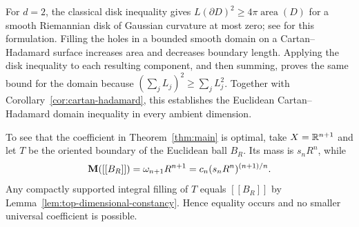 For $d=2$, the classical disk inequality gives
$L(\partial D)^2\ge4\pi\operatorname{area}(D)$ for a smooth
Riemannian disk of Gaussian curvature at most zero; see
\cite[Section~1.2, Theorem~3]{Izmestiev2014} for this formulation.
Filling the holes in a bounded smooth domain on a Cartan--Hadamard
surface increases area and decreases boundary length. Applying the disk
inequality to each resulting component, and then summing, proves the
same bound for the domain because $(\sum_j L_j)^2\ge\sum_jL_j^2$.
Together with Corollary~\ref{cor:cartan-hadamard}, this establishes the
Euclidean Cartan--Hadamard domain inequality in every ambient dimension.

To see that the coefficient in Theorem~\ref{thm:main} is optimal,
take $X=\mathbb R^{n+1}$ and let $T$ be the oriented boundary of the
Euclidean ball $B_R$. Its mass is $s_nR^n$, while
\[
 \mathbf M([[B_R]])=\omega_{n+1}R^{n+1}
 =c_n(s_nR^n)^{(n+1)/n}.
\]
Any compactly supported integral filling of $T$ equals $[[B_R]]$
by Lemma~\ref{lem:top-dimensional-constancy}. Hence equality occurs
and no smaller universal coefficient is possible.
